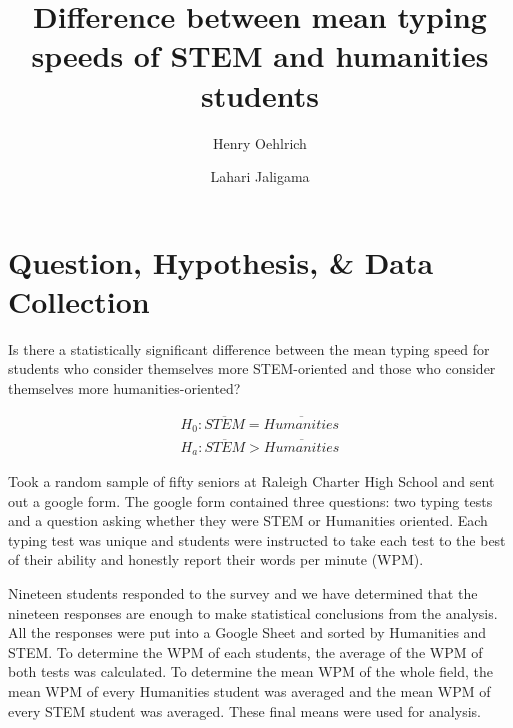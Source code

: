\documentclass{article}
\author{Henry Oehlrich \and Lahari Jaligama}
\title{Difference between mean typing speeds of STEM and humanities students}
\begin{document}
\maketitle{}

\section{Question, Hypothesis, \& Data Collection}

Is there a statistically significant difference between the mean typing speed
for students who consider themselves more STEM-oriented and those who consider
themselves more humanities-oriented?

\begin{gather}
    H_0: \overline{STEM} = \overline{Humanities} \\
    H_a: \overline{STEM} > \overline{Humanities}
\end{gather} 

Took a random sample of fifty seniors at Raleigh Charter High School and sent
out a google form. The google form contained three questions: two typing tests
and a question asking whether they were STEM or Humanities oriented. Each typing
test was unique and students were instructed to take each test to the best of
their ability and honestly report their words per minute (WPM).

Nineteen students responded to the survey and we have determined that the
nineteen responses are enough to make statistical conclusions from the
analysis. All the responses were put into a Google Sheet and sorted by
Humanities and STEM. To determine the WPM of each students, the average of the
WPM of both tests was calculated. To determine the mean WPM of the whole field,
the mean WPM of every Humanities student was averaged and the mean WPM of every
STEM student was averaged. These final means were used for analysis. \\
\end{document}
